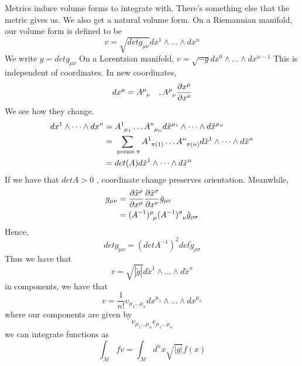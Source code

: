 \begin{claim}{Metrics induce volume forms to integrate with.}
There's something else that the metric gives us. 
We also get a natural volume form. On a Riemannian manifold, our 
volume form is defined to be 
\[
v = \sqrt{ det g_{ \mu \nu } }  dx^ 1 \wedge  \dots \wedge  dx^ n 
\] We write $ g = det g_{ \mu \nu }$
On a Lorentzian manifold, $ v = \sqrt{ - g }  dx^ 0  \wedge  \dots \wedge  dx^{ n- 1}$
This is independent of coordinates. 
In new coordinates, 
\[
dx ^ \mu = A \indices{ ^ \mu _ \nu } \quad, A \indices{ ^ \mu _ \nu } \frac{\partial x^ \mu }{\partial  x^ \nu }    
\] 
We see how they change. 
\begin{align*}
dx^ 1 \wedge  \dots \wedge  dx^ n & = A \indices{ ^ 1 _{ \mu _ 1 }} \dots A \indices{^ n _{ \mu _ n } } d \tilde{x} ^{ \mu _ 1} \wedge  \dots \wedge  d \tilde{x }^{ \mu _ n }   \\
				  &=  \sum_{ \text{ perms } \pi } A \indices{ ^ 1 _{ \pi ( 1)  } } \dots A \indices{ ^ n _{ \pi ( n ) } } d \tilde{x }^ 1 \wedge  \dots \wedge  d \tilde{x  }^ n      \\
		& = det ( A) d \tilde{x  }^ 1 \wedge  \dots \wedge  d \tilde{x } ^ n   
\end{align*} If we have that $ det A > 0 $ , coordinate change preserves 
orientation. 
Meanwhile, 
\begin{align*}
g_{ \mu \nu } &=  \frac{\partial  \tilde{x } ^ \rho  }{\partial  x ^ \mu }  \frac{\partial  \tilde{x } ^ \sigma  }{\partial  x^ \nu }  \tilde{ g }_{ \rho \sigma }  \\ 
       &=  ( A^{ - 1} ) \indices{ ^ \rho _  \mu } ( A ^{ - 1}) \indices{ ^ \sigma _ \nu } \tilde{g }_{ \rho \sigma }    \\
\end{align*} 
Hence, 
\[
det g _{ \mu \nu } = ( det A^{ - 1} ) ^ 2 det \tilde{ g } _{ \rho \sigma } 
\] Thus we have that 
\[
v = \sqrt{ | \tilde{ g } |  } d \tilde{x }^ 1 \wedge  \dots \wedge  d \tilde{ x }^ n    
\] in components, 
we have that 
\[
v = \frac{1}{ n ! } v_{ \mu_1 \dots \mu_ n } dx^{ \mu _ 1 } \wedge  \dots \wedge  dx^{ \mu _ n }
\] where our components are given by 
\[
v _{ \mu _ 1 \dots \mu _ n } \epsilon_{ \mu _ 1 \dots \mu _ n }
\] we can integrate functions as 
\[
\int_{ \mathcal{ M } } fv = \int_{ \mathcal{ M } } d^ n x \sqrt{ | g | } f (x)  
\] 


\end{claim}

